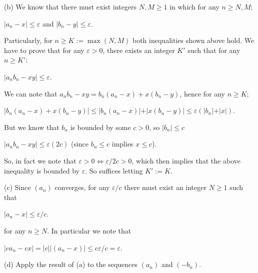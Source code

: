 \documentclass{article}
\theoremstyle{remark}
\begin{document}
\begin{enumerate}
            (b)
            We know that there must exist integers $N, M \geq 1$ in which for any $n \geq N,M$;
            \begin{center}
                $\displaystyle \vert a_n - x \vert \leq \varepsilon$ and $\displaystyle \vert b_n - y\vert \leq \varepsilon$.
            \end{center}
            Particularly, for $n \geq K := \max(N,M)$ both inequalities shown above hold.
            We have to prove that for any $\varepsilon > 0$, there exists an integer $K'$ such that for any $n\geq K'$:
            \begin{center}
                $\displaystyle \vert a_nb_n - xy \vert \leq \varepsilon$.
            \end{center}
            We can note that $a_nb_n - xy = b_n(a_n - x) + x(b_n - y)$, hence for any $n \geq K$;
            \begin{center}
                $\displaystyle \vert b_n(a_n-x) + x(b_n - y)\vert \leq \vert b_n(a_n - x)\vert + \vert x(b_n-y)\vert \leq \varepsilon(\vert b_n\vert + \vert x \vert)$.
            \end{center}
            But we know that $b_n$ is bounded by some $c > 0$, so $\vert b_n \vert \leq c$
            \begin{center}
                $\displaystyle \vert a_nb_n - xy\vert \leq \varepsilon(2c)$ (since $b_n \leq c$ implies $x \leq c$).
            \end{center}
            So, in fact we note that $\varepsilon > 0 \iff \varepsilon/2c > 0$, which then implies that the above inequality is bounded by $\varepsilon$.
            So suffices letting $K' := K$.

            (c) Since $(a_n)$ converges, for any $\varepsilon/c$ there must exist an integer $N \geq 1$ such that 
            \begin{center}
                $\displaystyle \vert a_n - x \vert \leq \varepsilon/c$.
            \end{center}
            for any $n \geq N$. In particular we note that 
            \begin{center}
                $\displaystyle \vert ca_n - cx \vert = \vert c\vert\vert (a_n - x)\vert \leq c\varepsilon/c = \varepsilon$.
            \end{center}

            (d) Apply the result of (a) to the sequences $(a_n)$ and $(-b_n)$.


\end{enumerate}
\end{document}
